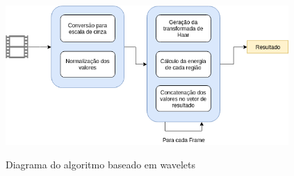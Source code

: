  \begin{figure}[h]
      \centering
      \caption{Diagrama do algoritmo baseado em wavelets}
      \includegraphics[width=0.96\textwidth]{dados/figuras/Wavelet.png}
       	\label{fig:dia_wavelet}
    \end{figure}  



